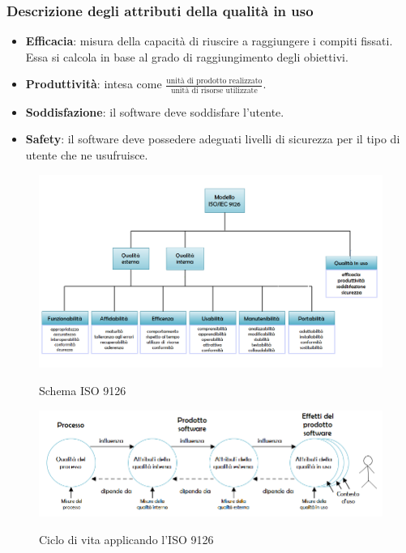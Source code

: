 		\subsubsection{Descrizione degli attributi della qualità in uso}
		\begin{itemize}
			\item \textbf{Efficacia}: misura della capacità di riuscire a raggiungere i compiti fissati. Essa si calcola
			in base al grado di raggiungimento degli obiettivi.
			\item \textbf{Produttività}: intesa come $ \frac{\text{unità di prodotto realizzato}}{\text{unità di risorse utilizzate}} $.
			\item \textbf{Soddisfazione}: il software deve soddisfare l'utente.
			\item \textbf{Safety}: il software deve possedere adeguati livelli di sicurezza per il tipo di utente che ne usufruisce.
		\end{itemize}
	
	\begin{figure}[H]
		\includegraphics[width=\textwidth]{img/ISO9126.png}
		\label{fig:iso9126}
		\caption[Schema ISO 9126]{Schema ISO 9126 \protect\footnotemark}
	\end{figure}

	
	\begin{figure}[H]
		\includegraphics[width=\textwidth]{img/Ciclo_di_vita_9126.png}
		\label{fig:ciclo_di_vita}
		\caption[Ciclo di vita con l'ISO 9126]{Ciclo di vita applicando l'ISO 9126 \protect\footnotemark[1]}
	\end{figure}

